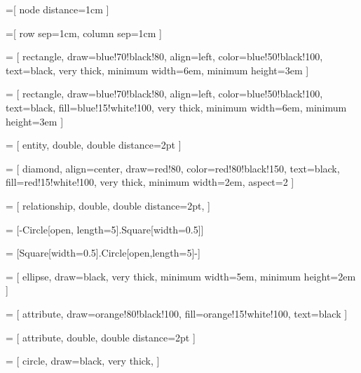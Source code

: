 \usetikzlibrary{positioning}
\usetikzlibrary{shapes.geometric}
\usetikzlibrary{arrows}
\usetikzlibrary{arrows.meta}
\usetikzlibrary{fit}
\usetikzlibrary{calc}
\usetikzlibrary{matrix}

=[
	node distance=1cm
]

=[
	row sep=1cm,
	column sep=1cm
]

 = [
rectangle,
draw=blue!70!black!80,
align=left,
color=blue!50!black!100,
text=black,
very thick, 
minimum width=6em, 
minimum height=3em
]

 = [
	rectangle,
	draw=blue!70!black!80,
	align=left,
	color=blue!50!black!100,
	text=black,
	fill=blue!15!white!100, 
	very thick, 
	minimum width=6em, 
	minimum height=3em
]

 = [
	entity,
	double, 
	double distance=2pt
]

 = [
	diamond,
	align=center,
	draw=red!80,
	color=red!80!black!150,
	text=black,
	fill=red!15!white!100,
	very thick,
	minimum width=2em,	
	aspect=2
]

 = [
	relationship, 
	double,
	double distance=2pt,
]

 = [-{Circle[open, length=5].Square[width=0.5]}]

 = [{Square[width=0.5].Circle[open,length=5]}-]

 = [
	ellipse, 
	draw=black,
	very thick,
	minimum width=5em,
	minimum height=2em
]

 = [
	attribute,
	draw=orange!80!black!100,
	fill=orange!15!white!100,
	text=black
]

 = [
	attribute,
	double,
	double distance=2pt
]

 = [
	circle,
	draw=black,
	very thick,
]
